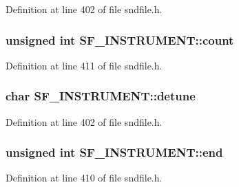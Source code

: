 Definition at line 402 of file sndfile.\+h.

\subsubsection[{\texorpdfstring{count}{count}}]{\setlength{\rightskip}{0pt plus 5cm}unsigned {\bf int} S\+F\+\_\+\+I\+N\+S\+T\+R\+U\+M\+E\+N\+T\+::count}\hypertarget{struct_s_f___i_n_s_t_r_u_m_e_n_t_af1a76686638c1d4d722a543cc09ca9bc}{}\label{struct_s_f___i_n_s_t_r_u_m_e_n_t_af1a76686638c1d4d722a543cc09ca9bc}


Definition at line 411 of file sndfile.\+h.

\subsubsection[{\texorpdfstring{detune}{detune}}]{\setlength{\rightskip}{0pt plus 5cm}char S\+F\+\_\+\+I\+N\+S\+T\+R\+U\+M\+E\+N\+T\+::detune}\hypertarget{struct_s_f___i_n_s_t_r_u_m_e_n_t_a15c6ebfa70d434dae34742c58a8ef9bf}{}\label{struct_s_f___i_n_s_t_r_u_m_e_n_t_a15c6ebfa70d434dae34742c58a8ef9bf}


Definition at line 402 of file sndfile.\+h.

\subsubsection[{\texorpdfstring{end}{end}}]{\setlength{\rightskip}{0pt plus 5cm}unsigned {\bf int} S\+F\+\_\+\+I\+N\+S\+T\+R\+U\+M\+E\+N\+T\+::end}\hypertarget{struct_s_f___i_n_s_t_r_u_m_e_n_t_aaae008f486b2db6b71564456736634a2}{}\label{struct_s_f___i_n_s_t_r_u_m_e_n_t_aaae008f486b2db6b71564456736634a2}


Definition at line 410 of file sndfile.\+h.

